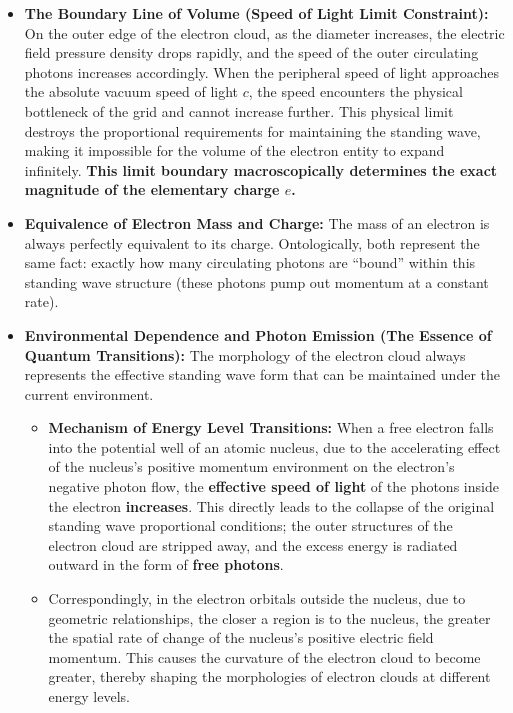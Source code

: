 \documentclass[12pt, a4paper]{article}
\begin{document}
\begin{itemize}
    \item \textbf{The Boundary Line of Volume (Speed of Light Limit Constraint):} On the outer edge of the electron cloud, as the diameter increases, the electric field pressure density drops rapidly, and the speed of the outer circulating photons increases accordingly. When the peripheral speed of light approaches the absolute vacuum speed of light $c$, the speed encounters the physical bottleneck of the grid and cannot increase further. This physical limit destroys the proportional requirements for maintaining the standing wave, making it impossible for the volume of the electron entity to expand infinitely. \textbf{This limit boundary macroscopically determines the exact magnitude of the elementary charge $e$.}
    \item \textbf{Equivalence of Electron Mass and Charge:} The mass of an electron is always perfectly equivalent to its charge. Ontologically, both represent the same fact: exactly how many circulating photons are ``bound'' within this standing wave structure (these photons pump out momentum at a constant rate).
    \item \textbf{Environmental Dependence and Photon Emission (The Essence of Quantum Transitions):} The morphology of the electron cloud always represents the effective standing wave form that can be maintained under the current environment. 
    \begin{itemize}
        \item \textbf{Mechanism of Energy Level Transitions:} When a free electron falls into the potential well of an atomic nucleus, due to the accelerating effect of the nucleus's positive momentum environment on the electron's negative photon flow, the \textbf{effective speed of light} of the photons inside the electron \textbf{increases}. This directly leads to the collapse of the original standing wave proportional conditions; the outer structures of the electron cloud are stripped away, and the excess energy is radiated outward in the form of \textbf{free photons}.
        \item Correspondingly, in the electron orbitals outside the nucleus, due to geometric relationships, the closer a region is to the nucleus, the greater the spatial rate of change of the nucleus's positive electric field momentum. This causes the curvature of the electron cloud to become greater, thereby shaping the morphologies of electron clouds at different energy levels.
    \end{itemize}
\end{itemize}
\end{document}
